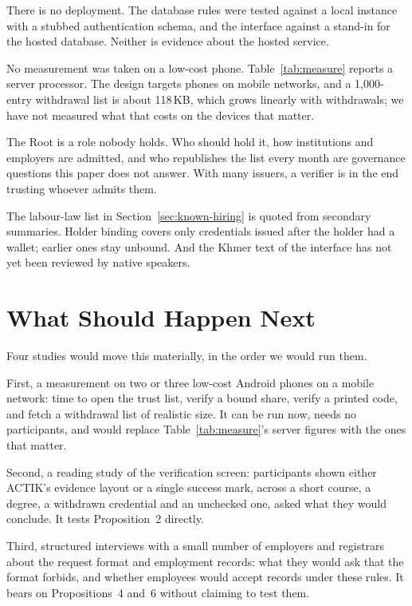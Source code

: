 \documentclass[10pt,a4paper,twocolumn]{article}
\begin{document}
There is no deployment. The database rules were tested against a local instance
with a stubbed authentication schema, and the interface against a stand-in for
the hosted database. Neither is evidence about the hosted service.

No measurement was taken on a low-cost phone. Table~\ref{tab:measure} reports a
server processor. The design targets phones on mobile networks, and a 1{,}000-entry
withdrawal list is about 118\,KB, which grows linearly with withdrawals; we have not
measured what that costs on the devices that matter.

The Root is a role nobody holds. Who should hold it, how institutions and
employers are admitted, and who republishes the list every month are governance
questions this paper does not answer. With many issuers, a verifier is in the end
trusting whoever admits them.

The labour-law list in Section~\ref{sec:known-hiring} is quoted from secondary
summaries. Holder binding covers only credentials issued after the holder had a
wallet; earlier ones stay unbound. And the Khmer text of the interface has not yet
been reviewed by native speakers.

\section{What Should Happen Next}
\label{sec:next}

Four studies would move this materially, in the order we would run them.

First, a measurement on two or three low-cost Android phones on a mobile network:
time to open the trust list, verify a bound share, verify a printed code, and
fetch a withdrawal list of realistic size. It can be run now, needs no
participants, and would replace Table~\ref{tab:measure}'s server figures with the
ones that matter.

Second, a reading study of the verification screen: participants shown either
ACTIK's evidence layout or a single success mark, across a short course, a degree,
a withdrawn credential and an unchecked one, asked what they would conclude. It
tests Proposition~2 directly.

Third, structured interviews with a small number of employers and registrars about
the request format and employment records: what they would ask that the format
forbids, and whether employees would accept records under these rules. It bears on
Propositions~4 and~6 without claiming to test them.
\end{document}
